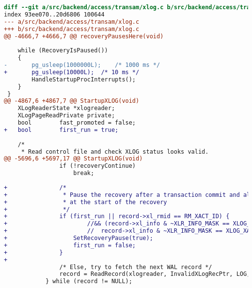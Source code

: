 
\begin{lstlisting}[caption={postgres-9.3.3.patch},language=diff]
diff --git a/src/backend/access/transam/xlog.c b/src/backend/access/transam/xlog.c
index 93ee070..20d6806 100644
--- a/src/backend/access/transam/xlog.c
+++ b/src/backend/access/transam/xlog.c
@@ -4666,7 +4666,7 @@ recoveryPausesHere(void)
 
 	while (RecoveryIsPaused())
 	{
-		pg_usleep(1000000L);	/* 1000 ms */
+		pg_usleep(10000L);	/* 10 ms */
 		HandleStartupProcInterrupts();
 	}
 }
@@ -4867,6 +4867,7 @@ StartupXLOG(void)
 	XLogReaderState *xlogreader;
 	XLogPageReadPrivate private;
 	bool		fast_promoted = false;
+	bool		first_run = true;
 
 	/*
 	 * Read control file and check XLOG status looks valid.
@@ -5696,6 +5697,17 @@ StartupXLOG(void)
 				if (!recoveryContinue)
 					break;
 
+				/*
+				 * Pause the recovery after a transaction commit and also
+				 * at the start of the recovery
+				 */
+				if (first_run || record->xl_rmid == RM_XACT_ID) {
+						//&& (record->xl_info & ~XLR_INFO_MASK == XLOG_XACT_COMMIT_COMPACT ||
+						//	record->xl_info & ~XLR_INFO_MASK == XLOG_XACT_COMMIT)) {
+					SetRecoveryPause(true);
+					first_run = false;
+				}
+
 				/* Else, try to fetch the next WAL record */
 				record = ReadRecord(xlogreader, InvalidXLogRecPtr, LOG, false);
 			} while (record != NULL);
\end{lstlisting}